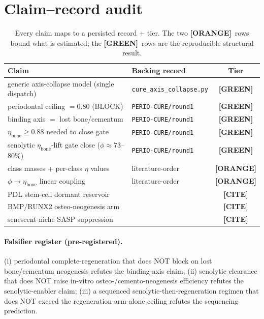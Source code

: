 \documentclass[11pt,a4paper]{article}
\newcommand{\tierbadge}[2]{\textcolor{#1}{\textbf{[#2]}}}
\providecommand{\tierGreen}{\tierbadge{green!45!black}{GREEN}}
\providecommand{\tierYellow}{\tierbadge{yellow!50!black}{CITE}}
\providecommand{\tierOrange}{\tierbadge{orange!80!black}{ORANGE}}
\begin{document}
\section{Claim--record audit}
\label{app:audit}
\begin{table}[h]\centering\small
\begin{tabular}{@{}>{\raggedright\arraybackslash}m{7.2cm} >{\raggedright\arraybackslash}m{3.8cm} c@{}}
\toprule
\textbf{Claim} & \textbf{Backing record} & \textbf{Tier} \\
\midrule
generic axis-collapse model (single dispatch) & \texttt{cure\_axis\_collapse.py} & \tierGreen \\
periodontal ceiling $=0.80$ (BLOCK) & \texttt{PERIO-CURE/round1} & \tierGreen \\
binding axis $=$ lost bone/cementum & \texttt{PERIO-CURE/round1} & \tierGreen \\
$\eta_{\text{bone}}\geq 0.88$ needed to close gate & \texttt{PERIO-CURE/round1} & \tierGreen \\
senolytic $\eta_{\text{bone}}$-lift gate close ($\phi\!\approx\!73$--$80\%$) & \texttt{PERIO-CURE/round1} & \tierGreen \\
class masses + per-class $\eta$ values & literature-order & \tierOrange \\
$\phi\!\to\!\eta_{\text{bone}}$ linear coupling & literature-order & \tierOrange \\
PDL stem-cell dormant reservoir & \citep{seo2004} & \tierYellow \\
BMP/RUNX2 osteo-neogenesis arm & \citep{wozney1988,komori2010} & \tierYellow \\
senescent-niche SASP suppression & \citep{coppe2010,moiseeva2023,baker2016} & \tierYellow \\
\bottomrule
\end{tabular}
\caption{Every claim maps to a persisted record + tier. The two \tierOrange\ rows
bound what is estimated; the \tierGreen\ rows are the reproducible structural result.}
\label{tab:audit}
\end{table}

\paragraph{Falsifier register (pre-registered).} (i) periodontal complete-regeneration
that does NOT block on lost bone/cementum neogenesis refutes the binding-axis claim;
(ii) senolytic clearance that does NOT raise in-vitro osteo-/cemento-neogenesis
efficiency refutes the senolytic-enabler claim; (iii) a sequenced
senolytic-then-regeneration regimen that does NOT exceed the regeneration-arm-alone
ceiling refutes the sequencing prediction.
\end{document}
